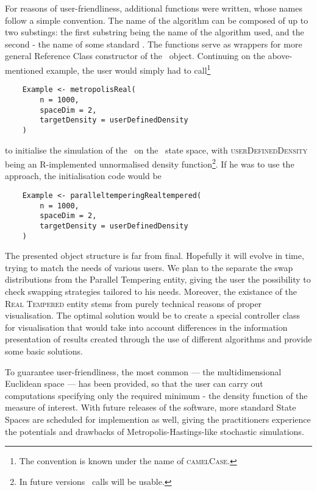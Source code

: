 \documentclass{book}
\begin{document}
For reasons of user-friendliness, additional functions were written, whose names follow a simple convention. The name of the algorithm can be composed of up to two substings: the first substring being the name of the algorithm used, and the second - the name of some standard \sspace. The functions serve as wrappers for more general Reference Class constructor of the \simulation\, object. Continuing on the above-mentioned example, the user would simply had to call\footnote{The convention is known under the name of \textsc{camelCase}.}

\begin{lstlisting}
	Example <- metropolisReal(
		n = 1000,
		spaceDim = 2,
		targetDensity = userDefinedDensity
	)
\end{lstlisting}  
to initialise the simulation of the \MHalgo\, on the \rspace\, state space, with \textsc{userDefinedDensity} being an R-implemented unnormalised density function\footnote{In future versions \Cpp\, calls will be usable.}. If he was to use the \PTalgo\, approach, the initialisation code would be 

\begin{lstlisting}
	Example <- paralleltemperingRealtempered(
		n = 1000,
		spaceDim = 2,
		targetDensity = userDefinedDensity
	)
\end{lstlisting}

The presented object structure is far from final. Hopefully it will evolve in time, trying to match the needs of various users. We plan to the separate the swap distributions from the Parallel Tempering entity, giving the user the possibility to check swapping strategies tailored to his needs. Moreover, the existance of the \textsc{Real Tempered} entity stems from purely technical reasons of proper visualisation. The optimal solution would be to create a special controller class for visualisation that would take into account differences in the information presentation of results created through the use of different algorithms and provide some basic solutions.

To guarantee user-friendliness, the most common \sspace --- the multidimensional Euclidean space --- has been provided, so that the user can carry out computations specifying only the required minimum - the density function of the measure of interest. With future releases of the software, more standard State Spaces are scheduled for implemention as well, giving the practitioners experience the potentials and drawbacks of Metropolis-Hastings-like stochastic simulations.
\end{document}
